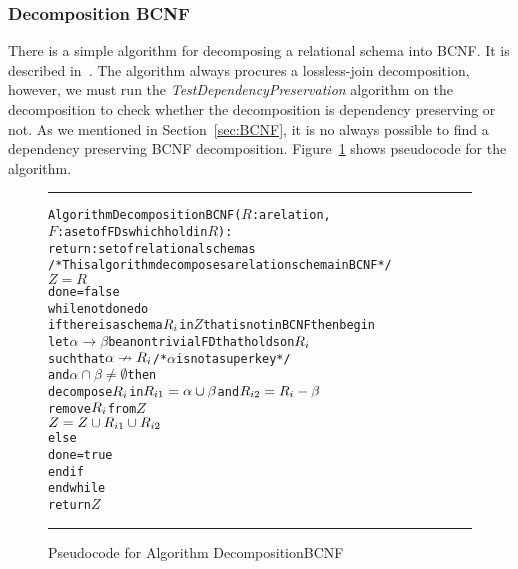 \subsubsection{Decomposition BCNF}
There is a simple algorithm for decomposing a relational schema into BCNF.
It is described in~\cite[Section 6.9]{bdb2}. The algorithm always 
procures a lossless-join decomposition, however, we must run the 
\textit{TestDependencyPreservation} algorithm on
the decomposition to check whether the decomposition is dependency preserving or not. 
As we mentioned in Section~\ref{sec:BCNF},
it is no always possible to find a dependency preserving BCNF decomposition.
Figure~\ref{alg:decbcnf} shows pseudocode for the algorithm.

\begin{figure}[htbp]
\hrule
\begin{alltt}

Algorithm DecompositionBCNF(\(R\): a relation,
             \(F\): a set of FDs which hold in \(R\)):
          return: set of relational schemas
/* This algorithm decomposes a relation schema in BCNF */
  \(Z = R\)
  done = false
  while not done do
    if there is a schema \(R\sb{i}\) in \(Z\)  that is not in BCNF then begin
      let \(\alpha \rightarrow \beta\) be a nontrivial FD that holds on \(R\sb{i}\)
        such that \(\alpha \nrightarrow R\sb{i}\) /* \(\alpha\) is not a superkey */
        and  \(\alpha \cap \beta \neq \emptyset\) then  
          decompose \(R\sb{i}\) in \(R\sb{i1} = \alpha \cup \beta\) and \(R\sb{i2} = R\sb{i} - \beta\)
          remove \(R\sb{i}\) from \(Z\) 
          \(Z = Z \cup R\sb{i1} \cup R\sb{i2}\)
    else 
      done = true
    end if 
  end while
  return \(Z\)
\end{alltt}
\caption{Pseudocode for Algorithm DecompositionBCNF}
\label{alg:decbcnf}
\hrule
\end{figure}
